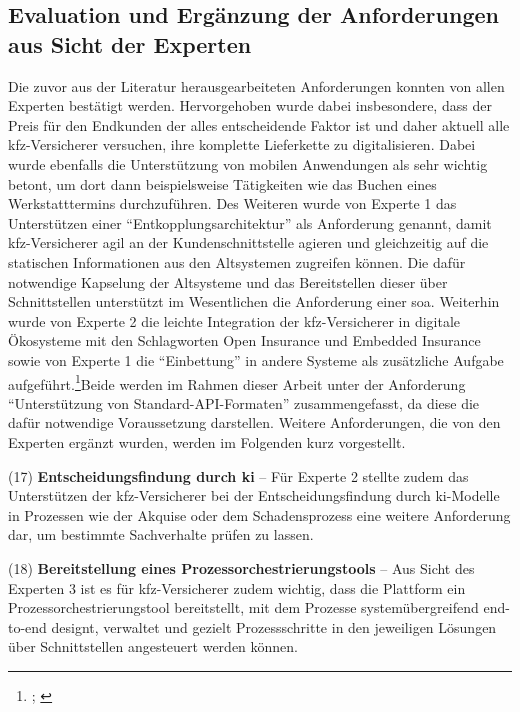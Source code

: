 \subsection{Evaluation und Ergänzung der Anforderungen aus Sicht der Experten}

Die zuvor aus der Literatur herausgearbeiteten Anforderungen konnten von allen Experten bestätigt werden. Hervorgehoben wurde dabei insbesondere, dass der Preis für den Endkunden der alles entscheidende Faktor ist und daher aktuell alle \ac{kfz}-Versicherer versuchen, ihre komplette Lieferkette zu digitalisieren. Dabei wurde ebenfalls die Unterstützung von mobilen Anwendungen als sehr wichtig betont, um dort dann beispielsweise Tätigkeiten wie das Buchen eines Werkstatttermins durchzuführen. Des Weiteren wurde von Experte 1 das Unterstützen einer \enquote{Entkopplungsarchitektur} als Anforderung genannt, damit \ac{kfz}-Versicherer agil an der Kundenschnittstelle agieren und gleichzeitig auf die statischen Informationen aus den Altsystemen zugreifen können.\autocite[Vgl.][]{LEMONIDIS2023} Die dafür notwendige Kapselung der Altsysteme und das Bereitstellen dieser über Schnittstellen unterstützt im Wesentlichen die Anforderung einer \ac{soa}. Weiterhin wurde von Experte 2 die leichte Integration der \ac{kfz}-Versicherer in digitale Ökosysteme mit den Schlagworten Open Insurance und Embedded Insurance sowie von Experte 1 die \enquote{Einbettung} in andere Systeme als zusätzliche Aufgabe aufgeführt.\footnote{\cites[Vgl.][]{GREBERT2023}; \cites[Vgl.][]{LEMONIDIS2023}}Beide werden im Rahmen dieser Arbeit unter der Anforderung \enquote{Unterstützung von Standard-API-Formaten} zusammengefasst, da diese die dafür notwendige Voraussetzung darstellen. Weitere Anforderungen, die von den Experten ergänzt wurden, werden im Folgenden kurz vorgestellt.

(17) \textbf{Entscheidungsfindung durch \ac{ki}} – Für Experte 2 stellte zudem das Unterstützen der \ac{kfz}-Versicherer bei der Entscheidungsfindung durch \ac{ki}-Modelle in Prozessen wie der Akquise oder dem Schadensprozess eine weitere Anforderung dar, um bestimmte Sachverhalte prüfen zu lassen.\autocite[Vgl.][]{GREBERT2023} 

(18) \textbf{Bereitstellung eines Prozessorchestrierungstools} – Aus Sicht des Experten 3 ist es für \ac{kfz}-Versicherer zudem wichtig, dass die Plattform ein Prozessorchestrierungstool bereitstellt, mit dem Prozesse systemübergreifend end-to-end designt, verwaltet und gezielt Prozessschritte in den jeweiligen Lösungen über Schnittstellen angesteuert werden können. \autocite[Vgl.][]{SCHMIDT2023} 


